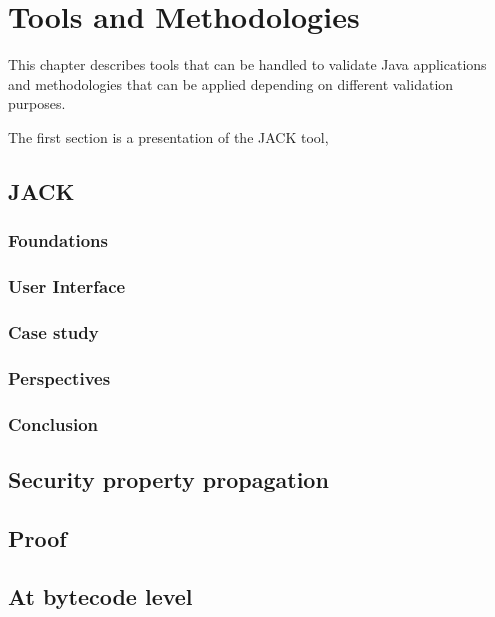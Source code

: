\chapter{Tools and Methodologies}
This chapter describes tools that can be handled to validate Java applications and methodologies that can be applied depending on different validation purposes.

The first section is a presentation of the JACK tool,
\section{JACK}

\subsection{Foundations}

\subsection{User Interface}

\subsection{Case study}

\subsection{Perspectives}

\subsection{Conclusion}


\section{Security property propagation}




%


\section{Proof}

\section{At bytecode level}








